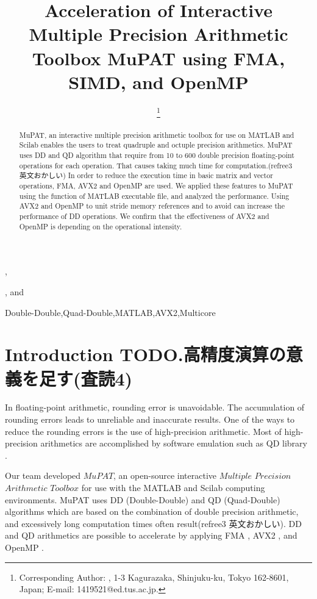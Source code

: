 \documentclass{IOS-Book-Article}
\begin{document}
\pagestyle{plain}

\begin{frontmatter} 
\title{ Acceleration of Interactive Multiple Precision Arithmetic Toolbox MuPAT using FMA,  SIMD, and OpenMP }
\author[A]{{ }
\thanks{Corresponding Author: {\color{blue}{Graduate School of Science of Department of Applied Mathematics}}, 1-3 Kagurazaka, Shinjuku-ku, Tokyo 162-8601, Japan; E-mail: 1419521@ed.tus.ac.jp.}},
\author[A]{ },
 and 
\author[B]{  }

\address[A]{Tokyo University of Science, Japan}
\address[B]{ University of Tsukuba, Japan}

\begin{abstract}
MuPAT, an interactive multiple precision arithmetic toolbox for use on MATLAB and Scilab enables the users to treat quadruple and octuple precision arithmetics. MuPAT uses DD and QD algorithm that require from 10 to 600 double precision floating-point operations for each operation. That causes taking much time for computation.(refree3 英文おかしい) In order to reduce the execution time in basic matrix and vector operations, FMA, AVX2 and OpenMP are used. We applied these features to MuPAT using the function of MATLAB executable file, and analyzed the performance. Using AVX2 and OpenMP to unit stride memory references and to avoid {\color{blue}{synchronization(typo:refree3)}} can increase the performance of DD operations. We confirm that the effectiveness of AVX2 and OpenMP is depending on the operational intensity. 
\end{abstract}
\begin{keyword}
Double-Double\sep Quad-Double\sep MATLAB\sep  AVX2\sep Multicore
\end{keyword}
\end{frontmatter}
\section{Introduction TODO.高精度演算の意義を足す(査読4)}

In floating-point arithmetic, rounding error is unavoidable. The accumulation of rounding errors leads to unreliable and inaccurate results. One of the ways to reduce the rounding errors is the use of high-precision arithmetic.  
Most of high-precision arithmetics are accomplished by software emulation such as QD library \cite{QD}. 

Our team developed $MuPAT$, an open-source interactive $Multiple$ $Precision$ $Arithmetic$ $Toolbox$ \cite{saito, hota} for use with the MATLAB and Scilab computing environments. MuPAT uses DD (Double-Double) \cite{DD} and QD (Quad-Double) \cite{QD,DD} algorithms which are based on the combination of double precision arithmetic, and excessively long computation times often result(refree3 英文おかしい). 
DD and QD arithmetics are possible to accelerate by applying FMA \cite{SIMD}, AVX2 \cite{SIMD}, and OpenMP \cite{omp}. 
\end{document}
